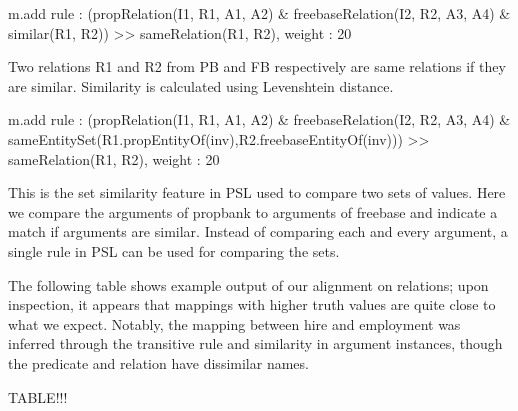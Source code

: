 m.add rule : (propRelation(I1, R1, A1, A2) \& freebaseRelation(I2, R2, A3, A4) \& similar(R1, R2)) >> sameRelation(R1, R2), weight : 20

Two relations R1 and R2 from PB and FB respectively are same relations if they are similar. Similarity is calculated using Levenshtein distance.

m.add rule : (propRelation(I1, R1, A1, A2) \& freebaseRelation(I2, R2, A3, A4) \& sameEntitySet({R1.propEntityOf(inv)},{R2.freebaseEntityOf(inv)})) >> sameRelation(R1, R2),  weight : 20

This is the set similarity feature in PSL used to compare two sets of values.
Here we compare the arguments of propbank to arguments of freebase and indicate a match if arguments are similar.
Instead of comparing each and every argument, a single rule in PSL can be used for comparing the sets.

The following table shows example output of our alignment on relations; upon inspection, it appears that mappings with higher truth values are quite close to what we expect.
Notably, the mapping between hire and employment was inferred through the transitive rule and similarity in argument instances, though the predicate and relation have dissimilar names.

TABLE!!!




